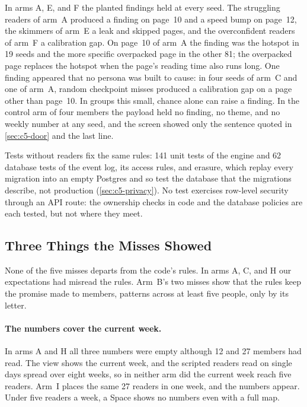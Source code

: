 In arms A, E, and F the planted findings held at every seed. The struggling
readers of arm~A produced a finding on page~10 and a speed bump on page~12,
the skimmers of arm~E a leak and skipped pages, and the overconfident readers
of arm~F a calibration gap. On page~10 of arm~A the finding was the hotspot in
19 seeds and the more specific overpacked page in the other 81; the overpacked
page replaces the hotspot when the page's reading time also runs long. One
finding appeared that no persona was built to cause: in four seeds of arm~C
and one of arm~A, random checkpoint misses produced a calibration gap on a
page other than page~10. In groups this small, chance alone can raise a
finding. In the control arm of four members the payload held no finding, no
theme, and no weekly number at any seed, and the screen showed only the
sentence quoted in \cref{sec:c5-door} and the last line.

Tests without readers fix the same rules: 141 unit tests of the engine and 62
database tests of the event log, its access rules, and erasure, which replay every migration into an empty Postgres and so
test the database that the migrations describe, not production
(\cref{sec:c5-privacy}). No test exercises row-level security through an API
route: the ownership checks in code and the database policies are each
tested, but not where they meet.

\subsection{Three Things the Misses Showed}
\label{sec:c5-findings}

None of the five misses departs from the code's rules. In arms A, C, and H our
expectations had misread the rules. Arm~B's two misses show that the rules keep
the promise made to members, patterns across at least five people, only by
its letter.

\paragraph{The numbers cover the current week.}
In arms A and H all three numbers were empty although 12 and 27 members had
read. The view shows the current week, and the scripted readers read on single
days spread over eight weeks, so in neither arm did the current week reach
five readers. Arm~I places the same 27 readers in one week, and the numbers
appear. Under five readers a week, a Space shows no numbers even
with a full map.

